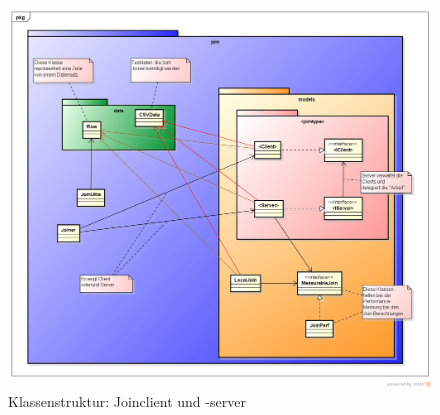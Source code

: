\documentclass[fontsize=12pt,a4paper,headinclude=no,headings=small]{scrartcl}
\begin{document}
\begin{appendix}
\begin{figure}[H]
	\centering
 	\includegraphics[width=\textwidth]{class-diagrams/join.png}
	\caption{Klassenstruktur: Joinclient und -server}
\end{figure}
\end{appendix}
\end{document}
